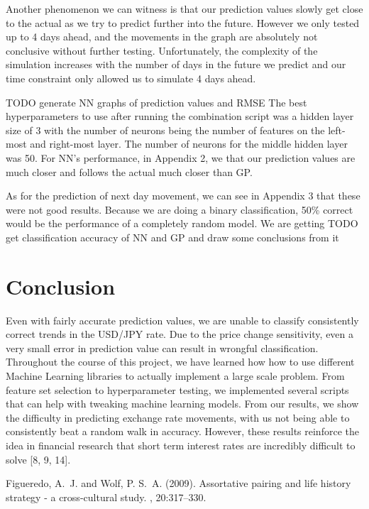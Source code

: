 \documentclass[twoside]{article}
\begin{document}
Another phenomenon we can witness is that our prediction values slowly get close to the actual as we try to predict further into the future. However we only tested up to 4 days ahead, and the movements in the graph are absolutely not conclusive without further testing. Unfortunately, the complexity of the simulation increases with the number of days in the future we predict and our time constraint only allowed us to simulate 4 days ahead. 

TODO generate NN graphs of prediction values and RMSE
The best hyperparameters to use after running the combination script was a hidden layer size of 3 with the number of neurons being the number of features on the left-most and right-most layer. The number of neurons for the middle hidden layer was 50. For NN’s performance, in Appendix 2, we that our prediction values are much closer and follows the actual much closer than GP.

As for the prediction of next day movement, we can see in Appendix 3 that these were not good results. Because we are doing a binary classification, 50\% correct would be the performance of a completely random model. We are getting TODO get classification accuracy of NN and GP and draw some conclusions from it



\section{Conclusion}

Even with fairly accurate prediction values, we are unable to classify consistently correct trends in the USD/JPY rate. Due to the price change sensitivity, even a very small error in prediction value can result in wrongful classification. Throughout the course of this project, we have learned how how to use different Machine Learning libraries to actually implement a large scale problem. From feature set selection to hyperparameter testing, we implemented several scripts that can help with tweaking machine learning models. From our results, we show the difficulty in predicting exchange rate movements, with us not being able to consistently beat a random walk in accuracy. However, these results reinforce the idea in financial research that short term interest rates are incredibly difficult to solve [8, 9, 14].




\begin{thebibliography}{99} %

Figueredo, A.~J. and Wolf, P. S.~A. (2009).
\newblock Assortative pairing and life history strategy - a cross-cultural
  study.
, 20:317--330.
 
\end{thebibliography}

\end{document}
